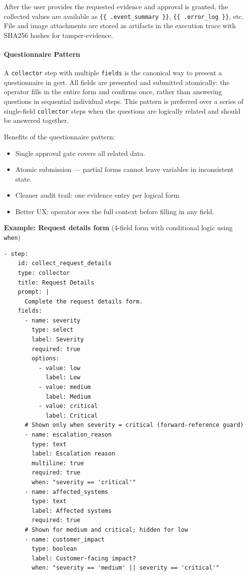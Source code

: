 After the user provides the requested evidence and approval is granted, the
collected values are available as \texttt{\{\{ .event\_summary \}\}},
\texttt{\{\{ .error\_log \}\}}, etc.  File and image attachments are stored as
artifacts in the execution trace with SHA256 hashes for tamper-evidence.

\paragraph{Questionnaire Pattern}
\label{par:questionnaire-pattern}

A \texttt{collector} step with multiple \texttt{fields} is the canonical way
to present a questionnaire in gert.  All fields are presented and submitted
atomically: the operator fills in the entire form and confirms once, rather than
answering questions in sequential individual steps.  This pattern is preferred
over a series of single-field \texttt{collector} steps when the questions are
logically related and should be answered together.

Benefits of the questionnaire pattern:
\begin{itemize}
  \item Single approval gate covers all related data.
  \item Atomic submission — partial forms cannot leave variables in inconsistent state.
  \item Cleaner audit trail: one evidence entry per logical form.
  \item Better UX: operator sees the full context before filling in any field.
\end{itemize}

\textbf{Example: Request details form} (4-field form with conditional logic using \texttt{when})

\begin{verbatim}
- step:
    id: collect_request_details
    type: collector
    title: Request Details
    prompt: |
      Complete the request details form.
    fields:
      - name: severity
        type: select
        label: Severity
        required: true
        options:
          - value: low
            label: Low
          - value: medium
            label: Medium
          - value: critical
            label: Critical
      # Shown only when severity = critical (forward-reference guard)
      - name: escalation_reason
        type: text
        label: Escalation reason
        multiline: true
        required: true
        when: "severity == 'critical'"
      - name: affected_systems
        type: text
        label: Affected systems
        required: true
      # Shown for medium and critical; hidden for low
      - name: customer_impact
        type: boolean
        label: Customer-facing impact?
        when: "severity == 'medium' || severity == 'critical'"
\end{verbatim}

